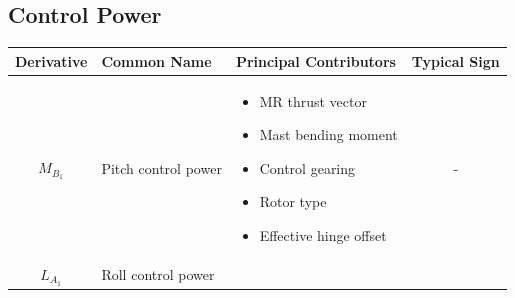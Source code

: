 \documentclass[
]{book}
\providecommand{\tightlist}{%
  \setlength{\itemsep}{0pt}\setlength{\parskip}{0pt}}
\begin{document}
\hypertarget{control-power}{%
\subsection{Control Power}\label{control-power}}

\begin{longtable}[]{@{}cllc@{}}
\toprule
\begin{minipage}[b]{0.25\columnwidth}\centering
\textbf{Derivative}\strut
\end{minipage} & \begin{minipage}[b]{0.21\columnwidth}\raggedright
\textbf{Common Name}\strut
\end{minipage} & \begin{minipage}[b]{0.27\columnwidth}\raggedright
\textbf{Principal Contributors}\strut
\end{minipage} & \begin{minipage}[b]{0.16\columnwidth}\centering
\textbf{Typical Sign}\strut
\end{minipage}\tabularnewline
\midrule
\endhead
\begin{minipage}[t]{0.25\columnwidth}\centering
\(M_{B_1}\)\strut
\end{minipage} & \begin{minipage}[t]{0.21\columnwidth}\raggedright
Pitch control power\strut
\end{minipage} & \begin{minipage}[t]{0.27\columnwidth}\raggedright
\begin{itemize}
\tightlist
\item
  MR thrust vector
\item
  Mast bending moment
\item
  Control gearing
\item
  Rotor type
\item
  Effective hinge offset
\end{itemize}\strut
\end{minipage} & \begin{minipage}[t]{0.16\columnwidth}\centering
-\strut
\end{minipage}\tabularnewline
\begin{minipage}[t]{0.25\columnwidth}\centering
\(L_{A_1}\)\strut
\end{minipage} & \begin{minipage}[t]{0.21\columnwidth}\raggedright
Roll control power\strut
\end{minipage} & \begin{minipage}[t]{0.27\columnwidth}\raggedright

\end{minipage}
\end{longtable}
\end{document}
